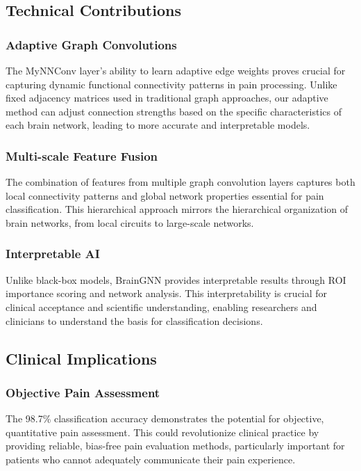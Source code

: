 \documentclass[10pt,journal,compsoc]{IEEEtran}
\begin{document}
\subsection{Technical Contributions}

\subsubsection{Adaptive Graph Convolutions}

The MyNNConv layer's ability to learn adaptive edge weights proves crucial for capturing dynamic functional connectivity patterns in pain processing. Unlike fixed adjacency matrices used in traditional graph approaches, our adaptive method can adjust connection strengths based on the specific characteristics of each brain network, leading to more accurate and interpretable models.

\subsubsection{Multi-scale Feature Fusion}

The combination of features from multiple graph convolution layers captures both local connectivity patterns and global network properties essential for pain classification. This hierarchical approach mirrors the hierarchical organization of brain networks, from local circuits to large-scale networks.

\subsubsection{Interpretable AI}

Unlike black-box models, BrainGNN provides interpretable results through ROI importance scoring and network analysis. This interpretability is crucial for clinical acceptance and scientific understanding, enabling researchers and clinicians to understand the basis for classification decisions.

\subsection{Clinical Implications}

\subsubsection{Objective Pain Assessment}

The 98.7\% classification accuracy demonstrates the potential for objective, quantitative pain assessment. This could revolutionize clinical practice by providing reliable, bias-free pain evaluation methods, particularly important for patients who cannot adequately communicate their pain experience.
\end{document}
